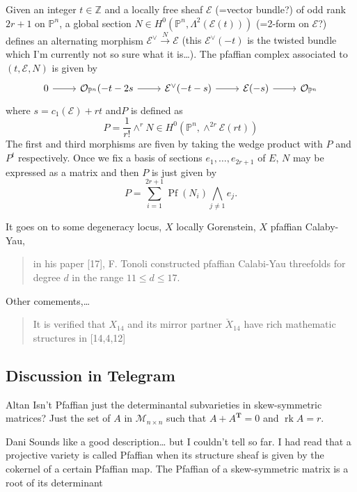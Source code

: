 Given an integer $t\in\mathbb{Z}$ and a locally free sheaf $\mathcal{E}$ {\color{persimmon}(=vector bundle?)} of odd rank $2r+1$ on  $\mathbb{P}^n$, a global section $N\in H^{0}(\mathbb{P}^n,\Lambda^{2}(\mathcal{E}(t)))$ {\color{persimmon}(=2-form on $\mathcal{E}$?)} defines an alternating morphism $\mathcal{E}^\vee \overset{N}{\longrightarrow}\mathcal{E}$ {\color{persimmon}(this $\mathcal{E}^\vee (-t)$ is the twisted bundle which I'm currently not so sure what it is…)}. The pfaffian complex associated to $(t,\mathcal{E},N)$ is given by
\[\begin{tikzcd}
0\arrow[r]&\mathcal{O}_{\mathbb{P}^n}(-t-2s\arrow[r]&\mathcal{E}^\vee (-t-s)\arrow[r]&\mathcal{E}(-s)\arrow[r]&\mathcal{O}_{\mathbb{P}^n}
\end{tikzcd}\]
where $s=c_1(\mathcal{E})+rt$ and$P$ is defined as
\[P=\frac{1}{r!}\wedge^rN \in H^{0}(\mathbb{P}^n,\wedge^{2r}\mathcal{E}(rt))\]
The first and third morphisms are fiven by taking the wedge product with $P$ and $P^{t}$ respectively. Once we fix a basis of sections $e_1,\ldots, e_{2r+1}$ of $E$, $N$ may be expressed as a matrix and then $P$ is just given by
\[P=\sum_{i=1}^{2r+1}\operatorname{Pf}(N_i)\bigwedge_{j\neq 1}e_j.\]

{\color{persimmon}It goes on to some degeneracy locus, $X$ locally Gorenstein, $X$ pfaffian Calaby-Yau,}
\begin{quotation}
	in his paper [17], F. Tonoli constructed pfaffian Calabi-Yau threefolds for degree $d$ in the range $11\leq d \leq 17$.
\end{quotation}
{\color{persimmon}Other comements,…}
\begin{quotation}
	It is verified that $X_{14}$ and its mirror partner $\check{X}_{14}$ have rich mathematic structures in [14,4,12]
\end{quotation}

\subsection{Discussion in Telegram}

\begin{thing3}{Altan}\leavevmode
Isn't Pfaffian just the determinantal subvarieties in skew-symmetric matrices?  Just the set of $A$ in $\mathcal{M}_{n\times n}$ such that $A + A^{\mathbf{T}} = 0$ and $\operatorname{rk} A = r$.
\end{thing3}

\begin{thing1}{Dani}\leavevmode
	Sounds like a good description… but I couldn’t tell so far. I had read that a projective variety is called Pfaffian when its structure sheaf is given by the cokernel of a certain Pfaffian map. The Pfaffian of a skew-symmetric matrix is a root of its determinant
\end{thing1}

